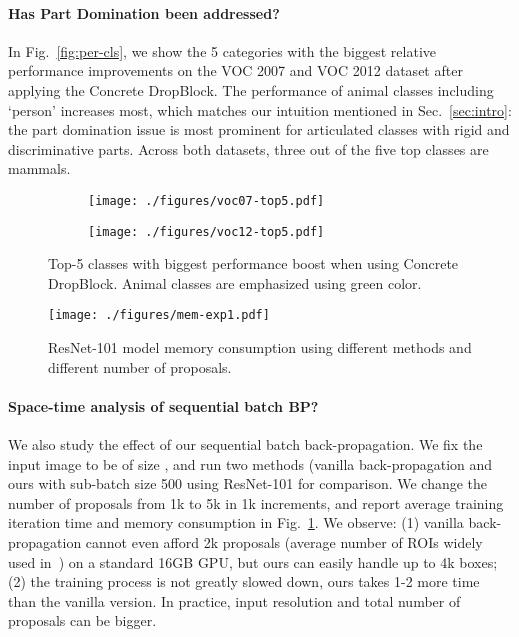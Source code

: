 \documentclass[10pt,twocolumn,letterpaper]{article}
\begin{document}
\vspace{-1em}
\paragraph{\textbf{Has Part Domination been addressed?}}
In Fig.~\ref{fig:per-cls}, we show the 5 categories with the biggest relative performance improvements on the VOC 2007 and VOC 2012 dataset after applying the Concrete DropBlock. The performance of animal classes including `person' increases most, which matches our intuition mentioned in Sec.~\ref{sec:intro}: the part domination issue is most prominent for articulated classes with rigid and discriminative parts. Across both datasets, three out of the five top classes are mammals.

\begin{figure}[t]
\centering
\begin{subfigure}{0.49\linewidth}
\centering\texttt{[image: ./figures/voc07-top5.pdf]}
\end{subfigure}\begin{subfigure}{0.49\linewidth}
\centering\texttt{[image: ./figures/voc12-top5.pdf]}
\end{subfigure}
\vspace{-1em}
\caption{Top-5 classes with biggest performance boost when using Concrete DropBlock. Animal classes are emphasized using green color.}
\label{fig:per-cls}
\vspace{0.5em}
\centering
\texttt{[image: ./figures/mem-exp1.pdf]}
\vspace{-1em}
\caption{ResNet-101 model memory consumption using different methods and different number of proposals.} 
\label{fig:mem-exp}
\vspace{-1em}
\end{figure}

\vspace{-1em}
\paragraph{\textbf{Space-time analysis of sequential batch BP?} }
We also study the effect of our sequential batch back-propagation. We fix the input image to be of size , and run two methods (vanilla back-propagation and ours with sub-batch size 500 using ResNet-101 for comparison. We change the number of proposals from 1k to 5k in 1k increments, and report average training iteration time and memory consumption in Fig.~\ref{fig:mem-exp}. We observe: (1)  vanilla back-propagation cannot even afford 2k proposals (average number of ROIs widely used in~\cite{fastrcnn, Bilen16, tang2017multiple}) on a standard 16GB GPU, but ours can easily handle up to 4k boxes; (2) the training process is not greatly slowed down, ours takes 1-2 more time than the vanilla version. In practice,  input resolution and total number of proposals can be  bigger. 
\end{document}
